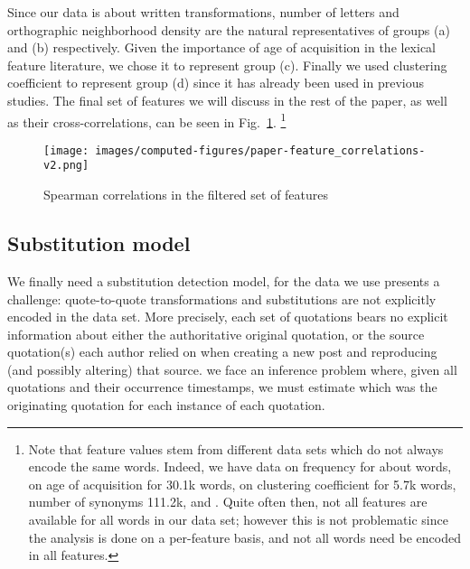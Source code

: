 \begin{new}
Since our data is about written transformations, number of letters and orthographic neighborhood density are the natural representatives of groups (a) and (b) respectively.
Given the importance of age of acquisition in the lexical feature literature, we chose it to represent group (c).
Finally we used clustering coefficient to represent group (d) since it has already been used in previous studies.
The final set of features we will discuss in the rest of the paper, as well as their cross-correlations, can be seen in Fig.~\ref{fig:feature-corrs-filtered}.%
\footnote{
Note that feature values stem from different data sets which do not always encode the same words.
Indeed, we have data on frequency for about  words, on age of acquisition for 30.1k words, on clustering coefficient for 5.7k words, number of synonyms 111.2k, and .
Quite often then, not all features are available for all words in our data set;
however this is not problematic since the analysis is done on a per-feature basis, and not all words need be encoded in all features.}
\end{new}

\begin{figure}[!th]
    \centering
    \texttt{[image: images/computed-figures/paper-feature\_correlations-v2.png]}
    \caption{Spearman correlations in the filtered set of features}
    \label{fig:feature-corrs-filtered}
\end{figure}


\subsection{Substitution model}
\label{sec:temporal-binning}\label{sec:model}

We finally need a substitution detection model, for the  data we use presents a challenge:
quote-to-quote transformations and substitutions are not explicitly encoded in the data set.
More precisely, each set of quotations bears no explicit information about either the authoritative original quotation, or the source quotation(s) each author relied on when creating a new post and reproducing (and possibly altering) that source.
 we face an inference problem where, given all quotations and their occurrence timestamps, we must estimate which was the originating quotation for each instance of each quotation.

